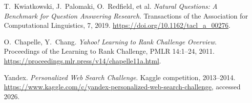 T.~Kwiatkowski, J.~Palomaki, O.~Redfield, et al.
\newblock \textit{Natural Questions: A Benchmark for Question Answering Research}.
\newblock Transactions of the Association for Computational Linguistics, 7, 2019.
\newblock \url{https://doi.org/10.1162/tacl_a_00276}.

O.~Chapelle, Y.~Chang.
\newblock \textit{Yahoo! Learning to Rank Challenge Overview}.
\newblock Proceedings of the Learning to Rank Challenge, PMLR 14:1--24, 2011.
\newblock \url{https://proceedings.mlr.press/v14/chapelle11a.html}.

Yandex.
\newblock \textit{Personalized Web Search Challenge}.
\newblock Kaggle competition, 2013--2014.
\newblock \url{https://www.kaggle.com/c/yandex-personalized-web-search-challenge}, accessed 2026.
